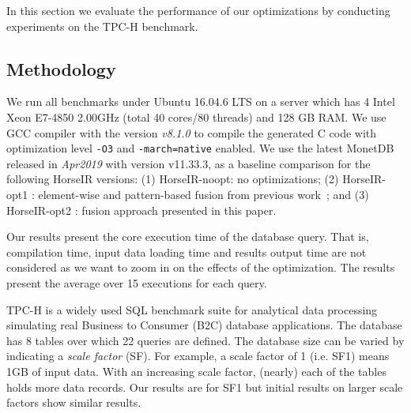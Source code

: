 In this section we evaluate the performance of our optimizations by conducting
experiments on the TPC-H benchmark. 

\subsection{Methodology}

We run all benchmarks under Ubuntu 16.04.6 LTS on a server which has 4 Intel
Xeon E7-4850 2.00GHz (total 40 cores/80 threads) and 128 GB RAM.
We use GCC compiler with the version \textit{v8.1.0} to compile the generated C
code with optimization level \texttt{-O3} and \texttt{-march=native} enabled.
We use the latest MonetDB~\cite{IdreosS2012} released in \textit{Apr2019} with
version v11.33.3, as a baseline comparison for the following HorseIR versions:
(1) HorseIR-noopt: no optimizations;
(2) HorseIR-opt1 : element-wise and pattern-based
fusion from previous work~\OldPaper; and
(3) HorseIR-opt2 : fusion approach presented in this paper.

Our results present the core execution time of the database query. That is,
compilation time, input data loading time and results output time are not considered
as we want to zoom in on the effects of the optimization. The results present
the average over 15 executions for each query.


TPC-H \cite{TPCH2017} is a widely used SQL benchmark suite for analytical data
processing simulating real Business to Consumer (B2C) database applications. The 
database has 8 tables over which 22 queries are defined.  The database size can be
varied by indicating a \textit{scale factor} (SF). For example, a scale factor of 1
(i.e. SF1) means 1GB of input data. With an increasing scale factor, (nearly) each
of the tables holds more data records. Our results are for SF1 but initial results
on larger scale factors show similar results.


